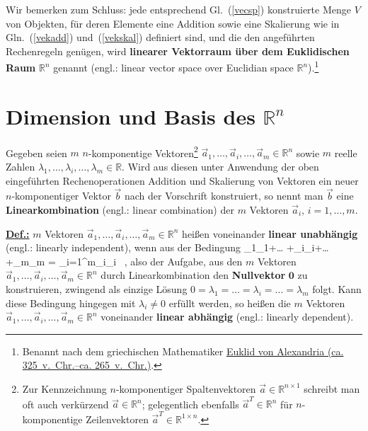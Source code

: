 \medskip
\noindent
Wir bemerken zum Schluss:
jede entsprechend Gl.~(\ref{vecsp}) konstruierte Menge $V$ von
Objekten, f\"ur deren Elemente eine Addition sowie eine
Skalierung wie in Gln.~(\ref{vekadd}) und~(\ref{vekskal})
definiert sind, und die den angef\"uhrten
Rechenregeln gen\"ugen, wird {\bf linearer Vektorraum \"uber
dem Euklidischen Raum} ${\mathbb R}^{n}$
genannt (engl.: linear vector space over Euclidian space ${\mathbb 
R}^{n}$).\footnote{Benannt nach dem griechischen Mathematiker
\href{http://www-groups.dcs.st-and.ac.uk/~history/Biographies/Euclid.html}{Euklid von Alexandria (ca. 325~v.~Chr.--ca. 265~v.~Chr.)}.}

\section[Dimension und Basis des ${\mathbb R}^{n}$]%
{Dimension und Basis des ${\mathbb R}^{n}$}
Gegeben seien $m$ $n$-komponentige Vektoren\footnote{Zur
Kennzeichnung $n$-komponentiger
Spaltenvektoren $\vec{a} \in \mathbb{R}^{n\times 1}$ schreibt man
oft auch verk\"urzend $\vec{a} \in \mathbb{R}^{n}$; gelegentlich
ebenfalls $\vec{a}^{T} \in \mathbb{R}^{n}$ f\"{u}r
$n$-komponentige Zeilenvektoren $\vec{a}^{T} \in
\mathbb{R}^{1\times n}$.} $\vec{a}_{1}, \ldots,
\vec{a}_{i}, \ldots, \vec{a}_{m} \in
{\mathbb R}^{n}$ sowie $m$ reelle Zahlen
$\lambda_{1}, \ldots, \lambda_{i}, \ldots, \lambda_{m}
\in {\mathbb R}$. Wird aus diesen unter Anwendung der 
oben eingef\"uhrten Rechenoperationen Addition und Skalierung von
Vektoren ein neuer $n$-komponentiger Vektor $\vec{b}$ nach der
Vorschrift
%
\be
{}
\ee
%
konstruiert, so nennt man $\vec{b}$ eine {\bf Linearkombination} 
(engl.: linear combination) der $m$ Vektoren $\vec{a}_{i},\,i=1, 
\ldots, m$.

\medskip
\noindent
\underline{\bf Def.:} $m$ Vektoren $\vec{a}_{1}, \ldots,
\vec{a}_{i}, \ldots, \vec{a}_{m} \in {\mathbb R}^{n}$ hei\ss en
voneinander {\bf linear unabh\"angig} (engl.: linearly 
independent), wenn aus der Bedingung
%
\be
{}
 \stackrel{!}{=} \lambda_{1}_{1}+\ldots
+\lambda_{i}_{i}+\ldots+\lambda_{m}_{m}
= \sum_{i=1}^{m}\lambda_{i}_{i} \ ,
\ee
%
also der Aufgabe, aus den $m$ Vektoren $\vec{a}_{1}, \ldots,
\vec{a}_{i}, \ldots, \vec{a}_{m} \in {\mathbb R}^{n}$ durch
Linearkombination den {\bf Nullvektor} $\boldsymbol{0}$ zu
konstruieren, zwingend als einzige L\"osung
$0=\lambda_{1}=\ldots=\lambda_{i}=\ldots=\lambda_{m}$ folgt.
Kann diese Bedingung hingegen mit $\lambda_{i} \neq 0$
erf\"ullt werden, so hei\ss en die $m$ Vektoren $\vec{a}_{1},
\ldots, \vec{a}_{i}, \ldots,\vec{a}_{m} \in {\mathbb R}^{n}$
voneinander {\bf linear abh\"angig} (engl.: linearly 
dependent).

